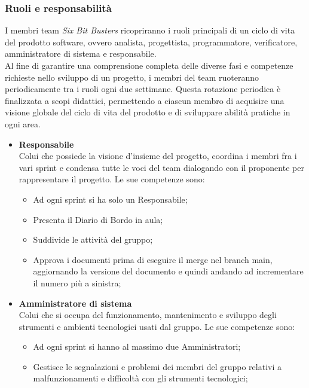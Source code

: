 \subsubsection{Ruoli e responsabilità}
I membri team \textit{Six Bit Busters} ricopriranno i ruoli principali di un
ciclo di vita del prodotto software, ovvero analista, progettista,
programmatore, verificatore, amministratore di sistema e responsabile. \\ Al
fine di garantire una comprensione completa delle diverse fasi e competenze
richieste nello sviluppo di un progetto, i membri del team ruoteranno
periodicamente tra i ruoli ogni due settimane. Questa rotazione periodica è
finalizzata a scopi didattici, permettendo a ciascun membro di acquisire una
visione globale del ciclo di vita del prodotto e di sviluppare abilità pratiche
in ogni area.
\begin{itemize}
    \item \textbf{Responsabile}\\
          Colui che possiede la visione d'insieme del progetto, coordina i membri fra i vari sprint e condensa tutte le voci del team
          dialogando con il proponente per rappresentare il progetto.
          Le sue competenze sono:
          \begin{itemize}
              \item Ad ogni sprint si ha solo un Responsabile;
              \item Presenta il Diario di Bordo in aula;
              \item Suddivide le attività del gruppo;
              \item Approva i documenti prima di eseguire il merge nel branch main, aggiornando la
                    versione del documento e quindi andando ad incrementare il numero più a
                    sinistra;
          \end{itemize}
    \item \textbf{Amministratore di sistema}\\
          Colui che si occupa del funzionamento, mantenimento e sviluppo degli strumenti e ambienti tecnologici
          usati dal gruppo.
          Le sue competenze sono:
          \begin{itemize}
              \item Ad ogni sprint si hanno al massimo due Amministratori;
              \item Gestisce le segnalazioni e problemi dei membri del gruppo relativi a
                    malfunzionamenti e difficoltà con gli strumenti tecnologici;

\end{itemize}
\end{itemize}
